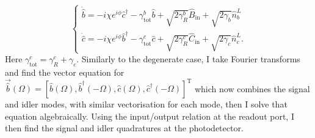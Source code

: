 \begin{equation}\begin{cases}\label{eq:nOPO_EoM}
\dot{\hat{b}}=-i\chi e^{i\phi}\hat{c}^\dagger - \gamma^b_\mathrm{tot} \hat{b} + \sqrt{2\gamma^b_R}\hat{B}_\mathrm{in} + \sqrt{2\gamma_b}\hat{n}^L_b\\
\dot{\hat{c}}=-i\chi e^{i\phi}\hat{b}^\dagger - \gamma^c_\mathrm{tot} \hat{c} + \sqrt{2\gamma^c_R}\hat{C}_\mathrm{in} + \sqrt{2\gamma_c}\hat{n}^L_c.
\end{cases}\end{equation}
Here $\gamma^c_\text{tot}=\gamma^c_R+\gamma_c$.
Similarly to the degenerate case, I take Fourier transforms and find the vector equation for $\vec{\hat b}(\Omega)=[\hat b(\Omega), \hat b^\dag(-\Omega), \hat c(\Omega), \hat c^\dag(-\Omega)]^\text{T}$ which now combines the signal and idler modes, with similar vectorisation for each mode, then I solve that equation algebraically. Using the input/output relation at the readout port, I then find the signal and idler quadratures at the photodetector.

